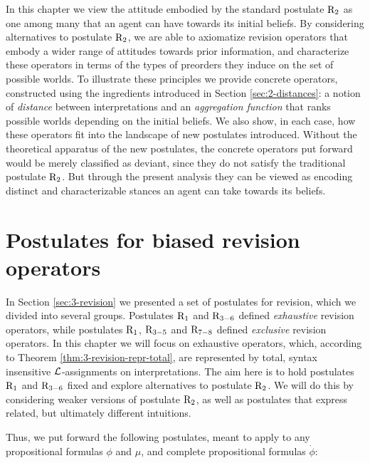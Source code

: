 In this chapter we view the attitude
embodied by the standard postulate $\mathrm{R}_{2}$ 
as one among many that an agent can have 
towards its initial beliefs.
By considering alternatives to
postulate $\mathrm{R}_{2}$,
we are able to axiomatize revision operators
that embody a wider range of attitudes towards prior information,
and characterize these operators in terms of the
types of preorders they induce on the set of possible worlds.
To illustrate these principles we provide concrete operators, 
constructed using the ingredients introduced in Section \ref{sec:2-distances}:
a notion of \emph{distance} between interpretations
and an \emph{aggregation function} that ranks possible worlds
depending on the initial beliefs.
We also show, in each case, how these operators fit into the landscape
of new postulates introduced. 
Without the theoretical apparatus of the new postulates,
the concrete operators put forward 
would be merely classified as deviant,
since they do not satisfy 
the traditional postulate $\mathrm{R}_{2}$.
But through the present analysis 
they can be viewed as encoding distinct and characterizable 
stances an agent can take towards its beliefs. 


\section{Postulates for biased revision operators}\label{sec:4-postulates}
In Section \ref{sec:3-revision} we presented a set of postulates for revision,
which we divided into several groups.
Postulates $\mathrm{R}_{1}$ and $\mathrm{R}_{3-6}$ defined \emph{exhaustive}
revision operators, while postulates $\mathrm{R}_{1}$, $\mathrm{R}_{3-5}$ and $\mathrm{R}_{7-8}$
defined \emph{exclusive} revision operators.
In this chapter we will focus on exhaustive operators,
which, according to Theorem \ref{thm:3-revision-repr-total}, 
are represented by total, syntax insensitive 
$\mathcal{L}$-assignments on interpretations.
The aim here is to hold postulates $\mathrm{R}_{1}$ and $\mathrm{R}_{3-6}$ fixed
and explore alternatives to postulate $\mathrm{R}_{2}$.
We will do this by considering weaker versions of postulate $\mathrm{R}_{2}$,
as well as postulates that express related, but ultimately different intuitions.

Thus, we put forward the following postulates,
meant to apply to any propositional formulas $\phi$ and $\mu$,
and complete propositional formulas $\dot{\phi}$:

